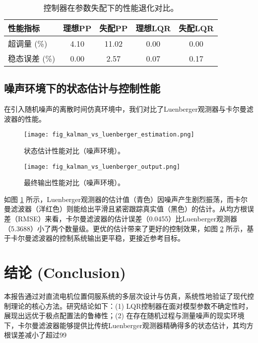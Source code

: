 \documentclass[12pt, a4paper]{article}
\begin{document}
\begin{table}[htbp]
    \centering
    \caption{控制器在参数失配下的性能退化对比。}
    \label{tab:performance2}
    \begin{tabular}{lcccc}
        \toprule
        \textbf{性能指标} & \textbf{理想PP} & \textbf{失配PP} & \textbf{理想LQR} & \textbf{失配LQR} \\
        \midrule
        超调量 (\%) & 4.10 & 11.02 & 0.00 & 0.00 \\
        稳态误差 (\%) & 0.00 & 2.57 & 0.07 & 0.17 \\
        \bottomrule
    \end{tabular}
\end{table}

\subsection{噪声环境下的状态估计与控制性能}
在引入随机噪声的离散时间仿真环境中，我们对比了Luenberger观测器与卡尔曼滤波器的性能。
\begin{figure}[htbp]
    \centering
    \texttt{[image: fig\_kalman\_vs\_luenberger\_estimation.png]}
    \caption{状态估计性能对比（噪声环境）。}
    \label{fig:estimation_noise}
\end{figure}
\begin{figure}[htbp]
    \centering
    \texttt{[image: fig\_kalman\_vs\_luenberger\_output.png]}
    \caption{最终输出性能对比（噪声环境）。}
    \label{fig:output_noise}
\end{figure}
如图 \ref{fig:estimation_noise} 所示，Luenberger观测器的估计值（青色）因噪声产生剧烈振荡，而卡尔曼滤波器（洋红色）则能给出平滑且紧密跟踪真实值（黑色）的估计。从均方根误差（RMSE）来看，卡尔曼滤波器的估计误差（0.0455）比Luenberger观测器（5.3688）小了两个数量级。更优的估计带来了更好的控制效果，如图 \ref{fig:output_noise} 所示，基于卡尔曼滤波器的控制系统输出更平稳，更接近参考目标。

\section{结论 (Conclusion)}
本报告通过对直流电机位置伺服系统的多层次设计与仿真，系统性地验证了现代控制理论的核心方法。研究结论如下：(1) LQR控制器在面对模型参数不确定性时，展现出远优于极点配置法的鲁棒性；(2) 在存在随机过程与测量噪声的现实环境下，卡尔曼滤波器能够提供比传统Luenberger观测器精确得多的状态估计，其均方根误差减小了超过99%
\end{document}

